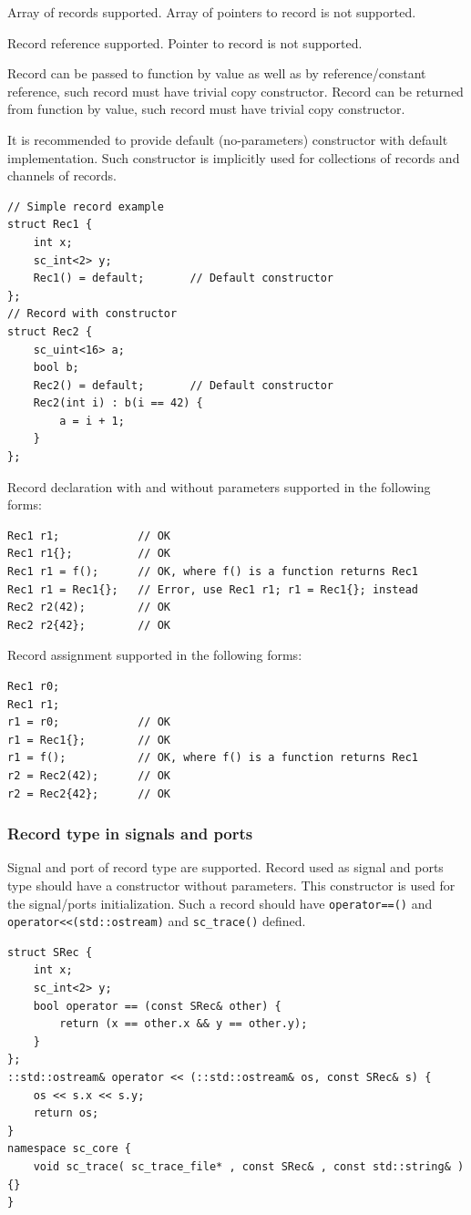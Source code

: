 Array of records supported. Array of pointers to record is not supported. 

Record reference supported. Pointer to record is not supported.

Record can be passed to function by value as well as by reference/constant reference, such record must have trivial copy constructor. Record can be returned from function by value, such record must have trivial copy constructor.

It is recommended to provide default (no-parameters) constructor with default implementation. Such constructor is implicitly used for collections of records and channels of records.
%
\begin{lstlisting}[style=mycpp]
// Simple record example
struct Rec1 {
    int x;
    sc_int<2> y;
    Rec1() = default;       // Default constructor 
};
// Record with constructor
struct Rec2 {
    sc_uint<16> a;       
    bool b;
    Rec2() = default;       // Default constructor 
    Rec2(int i) : b(i == 42) {
        a = i + 1;
    }
};
\end{lstlisting}

Record declaration with and without parameters supported in the following forms:
%
\begin{lstlisting}[style=mycpp]
Rec1 r1;        	// OK
Rec1 r1{};        	// OK
Rec1 r1 = f();    	// OK, where f() is a function returns Rec1
Rec1 r1 = Rec1{}; 	// Error, use Rec1 r1; r1 = Rec1{}; instead
Rec2 r2(42);    	// OK
Rec2 r2{42};    	// OK
\end{lstlisting}


Record assignment supported in the following forms:
%
\begin{lstlisting}[style=mycpp]
Rec1 r0;
Rec1 r1;
r1 = r0;            // OK
r1 = Rec1{};        // OK
r1 = f();           // OK, where f() is a function returns Rec1
r2 = Rec2(42);      // OK
r2 = Rec2{42};      // OK
\end{lstlisting}



\subsubsection{Record type in signals and ports}\label{section:rec_in_chan}

Signal and port of record type are supported. Record used as signal and ports type should have a constructor without parameters. This constructor is used for the signal/ports initialization. Such a record should have {\tt operator==()} and {\tt operator<<(std::ostream)} and {\tt sc\_trace()} defined.
%
\begin{lstlisting}[style=mycpp]
struct SRec {
    int x;
    sc_int<2> y;
    bool operator == (const SRec& other) {
        return (x == other.x && y == other.y);
    } 
};
::std::ostream& operator << (::std::ostream& os, const SRec& s) {
    os << s.x << s.y;
    return os;
}
namespace sc_core {
    void sc_trace( sc_trace_file* , const SRec& , const std::string& ) {}
}

\end{lstlisting}


